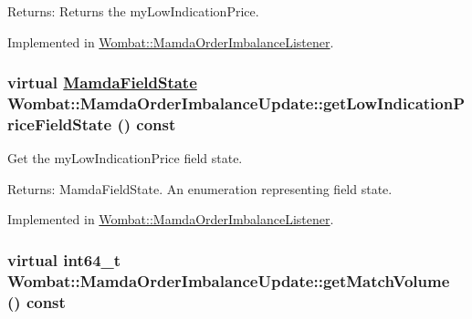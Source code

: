 \begin{Desc}
\item[Returns:]Returns the my\-Low\-Indication\-Price. \end{Desc}


Implemented in \hyperlink{classWombat_1_1MamdaOrderImbalanceListener_d52ff9594f69255d8ac514ffa8eabc84}{Wombat::Mamda\-Order\-Imbalance\-Listener}.\hypertarget{classWombat_1_1MamdaOrderImbalanceUpdate_e7efb8166108c7026e0b2ade4142421d}{
\subsubsection[getLowIndicationPriceFieldState]{\setlength{\rightskip}{0pt plus 5cm}virtual \hyperlink{namespaceWombat_93aac974f2ab713554fd12a1fa3b7d2a}{Mamda\-Field\-State} Wombat::Mamda\-Order\-Imbalance\-Update::get\-Low\-Indication\-Price\-Field\-State () const}}
\label{classWombat_1_1MamdaOrderImbalanceUpdate_e7efb8166108c7026e0b2ade4142421d}


Get the my\-Low\-Indication\-Price field state. 

\begin{Desc}
\item[Returns:]Mamda\-Field\-State. An enumeration representing field state. \end{Desc}


Implemented in \hyperlink{classWombat_1_1MamdaOrderImbalanceListener_e6c44322841ce2147abacb25a5cf8fae}{Wombat::Mamda\-Order\-Imbalance\-Listener}.\hypertarget{classWombat_1_1MamdaOrderImbalanceUpdate_c50318820325fed581abb910afc646ae}{
\subsubsection[getMatchVolume]{\setlength{\rightskip}{0pt plus 5cm}virtual int64\_\-t Wombat::Mamda\-Order\-Imbalance\-Update::get\-Match\-Volume () const}}
\label{classWombat_1_1MamdaOrderImbalanceUpdate_c50318820325fed581abb910afc646ae}


